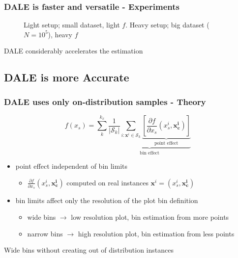 \documentclass{beamer}
\newcommand{\xb}{\boldsymbol{x}}
\begin{document}
\begin{frame}
  \frametitle{DALE is faster and versatile - Experiments}
  \begin{figure}[h]
  \centering
  \resizebox{.4\columnwidth}{!}{}
  \resizebox{.43\columnwidth}{!}{}
  \caption[Case-1-fig-1]{Light setup; small dataset, light \(f\). Heavy setup; big dataset (\(N=10^5\)), heavy \(f\)}
  \label{fig:case-1-plots-1}
\end{figure}

  \noindent\makebox[\linewidth]{\rule{\paperwidth}{0.4pt}}
  DALE considerably accelerates the estimation
\end{frame}


\subsection{DALE is more Accurate}

\begin{frame}
  \frametitle{DALE uses only on-distribution samples - Theory}
  \[f(x_s) = \sum_k^{k_x} \underbrace{\frac{1}{|\mathcal{S}_k|}
      \sum_{i:\xb^i \in \mathcal{S}_k} \underbrace{[\frac{\partial
          f}{\partial x_s}(x_s^i, \bm{x^i_c})]}_{\text{point
          effect}}}_{\text{bin effect}} \]

  \begin{itemize}
  \item point effect \alert{independent} of bin limits
    \begin{itemize}
    \item \(\frac{\partial f}{\partial x_s}(x_s^i, \bm{x^i_c})\)
      computed on real instances \(\bm{x}^i = (x_s^i, \bm{x_c^i})\)
    \end{itemize}
  \item bin limits affect only the \alert{resolution} of the plot bin
    definition
    \begin{itemize}
    \item wide bins \(\rightarrow\) low resolution plot, bin
      estimation from more points
    \item narrow bins \(\rightarrow\) high resolution plot, bin
      estimation from less points
    \end{itemize}
  \end{itemize}
  \noindent\makebox[\linewidth]{\rule{\paperwidth}{0.4pt}}
  Wide bins without creating out of distribution instances
\end{frame}
\end{document}
